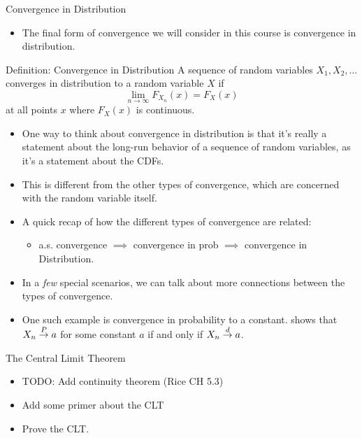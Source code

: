 \begin{frame}[allowframebreaks]{Convergence in Distribution}
  \begin{itemize}
    \item The final form of convergence we will consider in this course is convergence in distribution.
  \end{itemize}
  
  \begin{block}{Definition: Convergence in Distribution}
    A sequence of random variables $X_1, X_2, \ldots$ \alert{converges in distribution} to a random variable $X$ if
    $$
    \lim_{n \rightarrow \infty} F_{X_n}(x) = F_X(x)
    $$
    at all points $x$ where $F_X(x)$ is continuous.
  \end{block}
  
  \begin{itemize}
    \item One way to think about convergence in distribution is that it's really a statement about the long-run behavior of a sequence of random variables, as it's a statement about the CDFs. 
    \item This is different from the other types of convergence, which are concerned with the random variable itself.
    \item A quick recap of how the different types of convergence are related:
    \begin{itemize}
      \item a.s. convergence $\implies$ convergence in prob $\implies$ convergence in Distribution.
    \end{itemize}
    \item In a \emph{few} special scenarios, we can talk about more connections between the types of convergence.
    \item One such example is convergence in probability to a constant. \citet[Theorem~5.5.13 of][]{casella24} shows that $X_n \overset{P}{\rightarrow} a$ for some constant $a$ if and only if $X_n \overset{d}{\rightarrow} a$. 
  \end{itemize}
  
\end{frame}

\begin{frame}[allowframebreaks]{The Central Limit Theorem}
  \begin{itemize}
    \item TODO: Add continuity theorem (Rice CH 5.3)
    \item Add some primer about the CLT
    \item Prove the CLT. 
  \end{itemize}
\end{frame}

